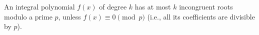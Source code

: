 An integral polynomial $f(x)$ of degree $k$ has at most $k$ incongruent roots modulo a prime $p$, unless $f(x) \equiv 0 \pmod{p}$ (i.e., all its coefficients are divisible by $p$).
